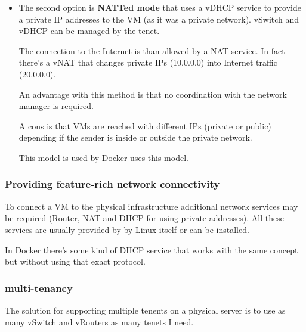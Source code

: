 \begin{itemize}
            \item The second option is \textbf{NATTed mode} that uses a vDHCP service to provide a private IP addresses to the VM (as it was a private network). vSwitch and vDHCP can be managed by the tenet.
            
            The connection to the Internet is than allowed by a NAT service. In fact there's a vNAT that changes private IPs (10.0.0.0) into Internet traffic (20.0.0.0).
            
            An advantage with this method is that no coordination with the network manager is required.
            
            A cons is that VMs are reached with different IPs (private or public) depending if the sender is inside or outside the private network.
            
            This model is used by Docker uses this model.
        \end{itemize}
        
        
    \subsubsection{Providing feature-rich network connectivity}

        To connect a VM to the physical infrastructure additional network services may be required (Router, NAT and DHCP for using private addresses). All these services are usually provided by by Linux itself or can be installed.
        
        In Docker there's some kind of DHCP service that works with the same concept but without using that exact protocol.
        
        
    \subsubsection{multi-tenancy}
        \FloatBarrier
        The solution for supporting multiple tenents on a physical server is to use as many vSwitch and vRouters as many tenets I need.
        
